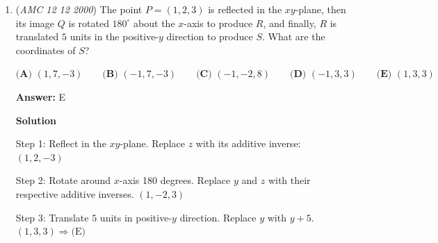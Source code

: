 \begin{enumerate}
 80= 0 mod(5)76+82+71+91= 0 mod(5)76+82+71+91= 0 mod(4)

 82= 2 mod(5)76+80+71+91= 0 mod(4)76+80+71+91= 3 mod(5)

 Case 1: 76324 is divisible by 4 324 divided by 5 is 1which means 76 is not the last number

 case 2:324-4=320320 is divisible by 4 320 is divisible by 5 which means this case is true. 

 case 3:320-2=318318 is not divisible by 4 which makes it incorrect even though 

 it has a remainder of 3 when divided by 5

 



\textbf{Solution 4}

The test numbers we have include 71, 76, 80, 82, 91 The answers are same numbers: 71, 76, 80, 82, 91 

 You could either subtract everything by 66 to make things easier5,10,14,16,25getting 70 when adding up now add 5,10,13,16,25 and it easier to see which one is divisible by 6

 or you could  perform the following action test number minus 6[test number/6]

 5,4,2,4,1add them up to get 6+6+4now we have to add another 2 for it to be divisible by 6

 before the operation 2 was actually 80 thus 80 is the answer

 


	\item (\textit{AMC 12 12 2000}) The point $P = (1,2,3)$ is reflected in the $xy$-plane, then its image $Q$ is rotated $180^\circ$ about the $x$-axis to produce $R$, and finally, $R$ is translated  $5$ units in the positive-$y$ direction to produce $S$. What are the coordinates of $S$?


 $\textbf {(A) } (1,7, - 3) \qquad \textbf {(B) } ( - 1,7, - 3) \qquad \textbf {(C) } ( - 1, - 2,8) \qquad \textbf {(D) } ( - 1,3,3) \qquad \textbf {(E) } (1,3,3)$

 \textbf{Answer: }E



\textbf{Solution}

Step 1: Reflect in the $xy$-plane. Replace $z$ with its additive inverse: $(1,2,-3)$

 Step 2: Rotate around $x$-axis 180 degrees. Replace $y$ and $z$ with their respective additive inverses. $(1, -2, 3)$

 Step 3: Translate $5$ units in positive-$y$ direction. Replace $y$ with $y+5$. $(1,3,3) \Rightarrow \text {(E) }$




\end{enumerate}
